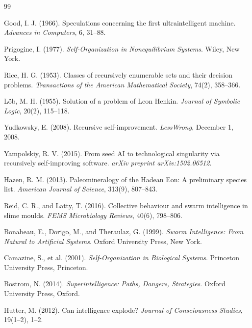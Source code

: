 \documentclass[11pt]{article}
\begin{document}
\newpage
\begin{thebibliography}{99}

Good, I. J. (1966).
Speculations concerning the first ultraintelligent machine.
\emph{Advances in Computers}, 6, 31--88.

Prigogine, I. (1977).
\emph{Self-Organization in Nonequilibrium Systems}.
Wiley, New York.

Rice, H. G. (1953).
Classes of recursively enumerable sets and their decision problems.
\emph{Transactions of the American Mathematical Society}, 74(2), 358--366.

L{\"o}b, M. H. (1955).
Solution of a problem of Leon Henkin.
\emph{Journal of Symbolic Logic}, 20(2), 115--118.

Yudkowsky, E. (2008).
Recursive self-improvement.
\emph{LessWrong}, December 1, 2008.

Yampolskiy, R. V. (2015).
From seed AI to technological singularity via recursively self-improving software.
\emph{arXiv preprint arXiv:1502.06512}.

Hazen, R. M. (2013).
Paleomineralogy of the Hadean Eon: A preliminary species list.
\emph{American Journal of Science}, 313(9), 807--843.

Reid, C. R., and Latty, T. (2016).
Collective behaviour and swarm intelligence in slime moulds.
\emph{FEMS Microbiology Reviews}, 40(6), 798--806.

Bonabeau, E., Dorigo, M., and Theraulaz, G. (1999).
\emph{Swarm Intelligence: From Natural to Artificial Systems}.
Oxford University Press, New York.

Camazine, S., et al. (2001).
\emph{Self-Organization in Biological Systems}.
Princeton University Press, Princeton.

Bostrom, N. (2014).
\emph{Superintelligence: Paths, Dangers, Strategies}.
Oxford University Press, Oxford.

Hutter, M. (2012).
Can intelligence explode?
\emph{Journal of Consciousness Studies}, 19(1--2), 1--2.

\end{thebibliography}
\end{document}
